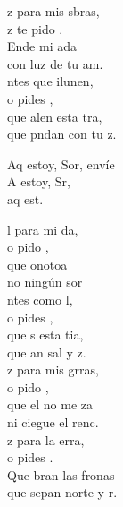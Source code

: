 \begin{cancion}[Envíame][Ixcís]%
	z para mis sbras,\\
	z te pido . \\
	Ende mi ada\\
	con  luz de tu am.\\
	ntes que ilunen, \\
	o pides , \\
	que alen esta tra,\\
	que pndan con tu z.\jump\\
	\begin{chorus}%
		Aq estoy, Sor, envíe  \\
		A estoy, Sr, \\
		aq est.  \jump\\
	\end{chorus}%
	l para mi da,\\
	o pido , \\
	que onotoa \\
	no  ningún sor\\
	ntes como l,\\
	o pides , \\
	que s esta tia,\\
	que an sal y z.\\
	\jump
	z para mis grras, \\
	o pido , \\
	que el  no me za  \\
	ni  ciegue el renc.\\
	z para la erra,  \\
	o pides .\\
	Que bran las fronas \\
	que sepan norte y r.\\
\end{cancion}%
